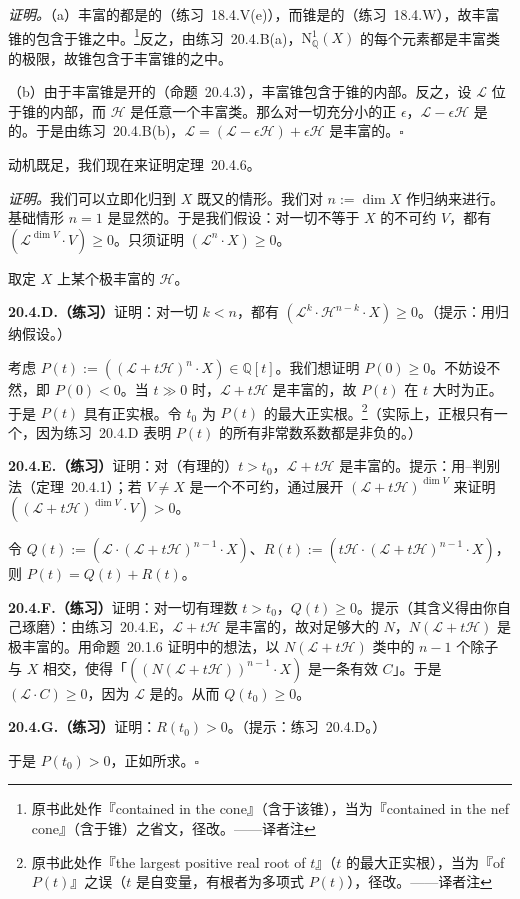 \emph{证明。}\quad（a）丰富的\trInvertibleSheaf{}都是\trNef{}的（\mbox{练习~18.4.V(e)}），而\trNef{}锥是\trClosed{}的（\mbox{练习~18.4.W}），故丰富锥的\trClosure{}包含于\trNef{}锥之中。\footnote{原书此处作『contained in the cone』（含于该锥），当为『contained in the nef cone』（含于\trNef{}锥）之省文，径改。——译者注}反之，由\mbox{练习~20.4.B(a)}，$\mathrm{N}^1_{\mathbb{Q}}(X)$ 的每个\trNef{}元素都是丰富类的极限，故\trNef{}锥包含于丰富锥的\trClosure{}之中。

（b）由于丰富锥是开的（\mbox{命题~20.4.3}），丰富锥包含于\trNef{}锥的内部。反之，设 $\mathscr{L}$ 位于\trNef{}锥的内部，而 $\mathscr{H}$ 是任意一个丰富类。那么对一切充分小的正 $\epsilon$，$\mathscr{L}-\epsilon\mathscr{H}$ 是\trNef{}的。于是由\mbox{练习~20.4.B(b)}，$\mathscr{L}=(\mathscr{L}-\epsilon\mathscr{H})+\epsilon\mathscr{H}$ 是丰富的。\hfill$\square$

动机既足，我们现在来证明\mbox{\trKleiman{}定理~20.4.6}。

\emph{证明。}\quad 我们可以立即化归到 $X$ 既\trIrreducible{}又\trReduced{}的情形。我们对 $n:=\dim X$ 作归纳来进行。基础情形 $n=1$ 是显然的。于是我们假设：对一切不等于 $X$ 的不可约 $V$，都有 $(\mathscr{L}^{\dim V}\cdot V)\ge 0$。只须证明 $(\mathscr{L}^n\cdot X)\ge 0$。

取定 $X$ 上某个极丰富的\trInvertibleSheaf{} $\mathscr{H}$。

\textbf{20.4.D.（练习）}\quad 证明：对一切 $k<n$，都有 $(\mathscr{L}^k\cdot\mathscr{H}^{n-k}\cdot X)\ge 0$。（提示：用归纳假设。）

考虑 $P(t):=((\mathscr{L}+t\mathscr{H})^n\cdot X)\in\mathbb{Q}[t]$。我们想证明 $P(0)\ge 0$。不妨设不然，即 $P(0)<0$。当 $t\gg 0$ 时，$\mathscr{L}+t\mathscr{H}$ 是丰富的，故 $P(t)$ 在 $t$ 大时为正。于是 $P(t)$ 具有正实根。令 $t_0$ 为 $P(t)$ 的最大正实根。\footnote{原书此处作『the largest positive real root of $t$』（$t$ 的最大正实根），当为『of $P(t)$』之误（$t$ 是自变量，有根者为多项式 $P(t)$），径改。——译者注}（实际上，正根只有一个，因为\mbox{练习~20.4.D} 表明 $P(t)$ 的所有非常数系数都是非负的。）

\textbf{20.4.E.（练习）}\quad 证明：对（有理的）$t>t_0$，$\mathscr{L}+t\mathscr{H}$ 是丰富的。提示：用\trNakai--\trMoishezon{}判别法（\mbox{定理~20.4.1}）；若 $V\ne X$ 是一个不可约\trSubvariety，通过展开 $(\mathscr{L}+t\mathscr{H})^{\dim V}$ 来证明 $((\mathscr{L}+t\mathscr{H})^{\dim V}\cdot V)>0$。

令 $Q(t):=(\mathscr{L}\cdot(\mathscr{L}+t\mathscr{H})^{n-1}\cdot X)$、$R(t):=(t\mathscr{H}\cdot(\mathscr{L}+t\mathscr{H})^{n-1}\cdot X)$，则 $P(t)=Q(t)+R(t)$。

\textbf{20.4.F.（练习）}\quad 证明：对一切有理数 $t>t_0$，$Q(t)\ge 0$。提示（其含义得由你自己琢磨）：由\mbox{练习~20.4.E}，$\mathscr{L}+t\mathscr{H}$ 是丰富的，故对足够大的 $N$，$N(\mathscr{L}+t\mathscr{H})$ 是极丰富的。用\mbox{命题~20.1.6} 证明中的想法，以 $N(\mathscr{L}+t\mathscr{H})$ 类中的 $n-1$ 个除子与 $X$ 相交，使得「$((N(\mathscr{L}+t\mathscr{H}))^{n-1}\cdot X)$ 是一条有效\trCurve{} $C$」。于是 $(\mathscr{L}\cdot C)\ge 0$，因为 $\mathscr{L}$ 是\trNef{}的。从而 $Q(t_0)\ge 0$。

\textbf{20.4.G.（练习）}\quad 证明：$R(t_0)>0$。（提示：\mbox{练习~20.4.D}。）

于是 $P(t_0)>0$，正如所求。\hfill$\square$
